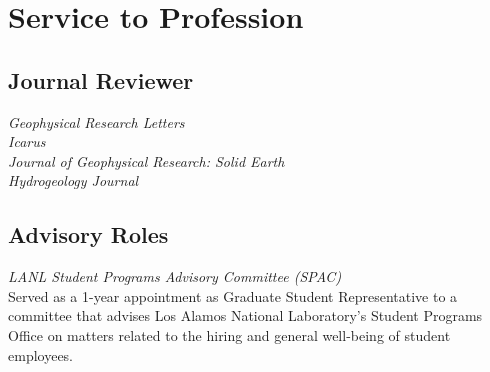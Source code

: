 \documentclass[11pt, letterpaper]{article}
\newcommand{\years}[1]{\marginnote{\scriptsize #1}}
\begin{document}
\section*{Service to Profession}

\subsection*{Journal Reviewer}

	\textit{Geophysical Research Letters}\\
	\textit{Icarus}\\
	\textit{Journal of Geophysical Research: Solid Earth}\\
	\textit{Hydrogeology Journal}


\subsection*{Advisory Roles}\noindent

\years{2018 - 2019} \textit{LANL Student Programs Advisory Committee (SPAC)}\\
Served as a 1-year appointment as Graduate Student Representative to a committee that advises Los Alamos National Laboratory's Student Programs Office on matters related to the hiring and general well-being of student employees.
\end{document}
